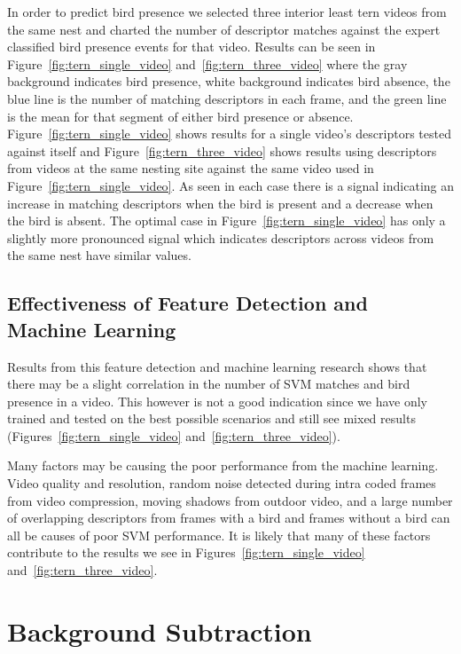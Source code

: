 In order to predict bird presence we selected three interior least tern videos from the same nest and charted the number of descriptor matches against the expert classified bird presence events for that video. Results can be seen in Figure~\ref{fig:tern_single_video} and~\ref{fig:tern_three_video} where the gray background indicates bird presence, white background indicates bird absence, the blue line is the number of matching descriptors in each frame, and the green line is the mean for that segment of either bird presence or absence. Figure~\ref{fig:tern_single_video} shows results for a single video's descriptors tested against itself and Figure~\ref{fig:tern_three_video} shows results using descriptors from videos at the same nesting site against the same video used in Figure~\ref{fig:tern_single_video}. As seen in each case there is a signal indicating an increase in matching descriptors when the bird is present and a decrease when the bird is absent. The optimal case in Figure~\ref{fig:tern_single_video} has only a slightly more pronounced signal which indicates descriptors across videos from the same nest have similar values.


\subsection{Effectiveness of Feature Detection and Machine Learning}
\label{sec:results_machine_learning_effectiveness}

Results from this feature detection and machine learning research shows that there may be a slight correlation in the number of SVM matches and bird presence in a video. This however is not a good indication since we have only trained and tested on the best possible scenarios and still see mixed results (Figures~\ref{fig:tern_single_video} and~\ref{fig:tern_three_video}).

Many factors may be causing the poor performance from the machine learning. Video quality and resolution, random noise detected during intra coded frames from video compression, moving shadows from outdoor video, and a large number of overlapping descriptors from frames with a bird and frames without a bird can all be causes of poor SVM performance. It is likely that many of these factors contribute to the results we see in Figures~\ref{fig:tern_single_video} and~\ref{fig:tern_three_video}.


\section{Background Subtraction}
\label{sec:results_background_subtraction}


